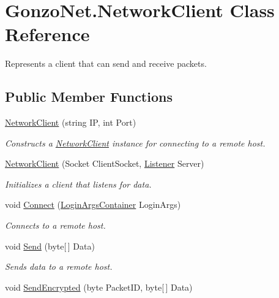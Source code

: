 \hypertarget{class_gonzo_net_1_1_network_client}{\section{Gonzo\+Net.\+Network\+Client Class Reference}
\label{class_gonzo_net_1_1_network_client}
}


Represents a client that can send and receive packets.  


\subsection*{Public Member Functions}
\begin{DoxyCompactItemize}
\item 
\hyperlink{class_gonzo_net_1_1_network_client_a195bee80c5fb96e4c611239684eaabd5}{Network\+Client} (string I\+P, int Port)
\begin{DoxyCompactList}\small\item\em Constructs a \hyperlink{class_gonzo_net_1_1_network_client}{Network\+Client} instance for connecting to a remote host. \end{DoxyCompactList}\item 
\hyperlink{class_gonzo_net_1_1_network_client_aa50411b59d0e591fadfd5b2cfaca170b}{Network\+Client} (Socket Client\+Socket, \hyperlink{class_gonzo_net_1_1_listener}{Listener} Server)
\begin{DoxyCompactList}\small\item\em Initializes a client that listens for data. \end{DoxyCompactList}\item 
void \hyperlink{class_gonzo_net_1_1_network_client_a338753d0ff867a205768b830d7e8f2ba}{Connect} (\hyperlink{class_gonzo_net_1_1_login_args_container}{Login\+Args\+Container} Login\+Args)
\begin{DoxyCompactList}\small\item\em Connects to a remote host. \end{DoxyCompactList}\item 
void \hyperlink{class_gonzo_net_1_1_network_client_af80d0341a9cb2920b33322950715a28f}{Send} (byte\mbox{[}$\,$\mbox{]} Data)
\begin{DoxyCompactList}\small\item\em Sends data to a remote host. \end{DoxyCompactList}\item 
void \hyperlink{class_gonzo_net_1_1_network_client_a246a12a66950146719a40b0962a45030}{Send\+Encrypted} (byte Packet\+I\+D, byte\mbox{[}$\,$\mbox{]} Data)

\end{DoxyCompactItemize}
